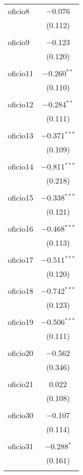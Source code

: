 \begin{table}[!htbp]
\begin{tabular}{@{\extracolsep{5pt}}lc}
 oficio8 & $-$0.076 \\ 
  & (0.112) \\ 
  & \\ 
 oficio9 & $-$0.123 \\ 
  & (0.120) \\ 
  & \\ 
 oficio11 & $-$0.260$^{**}$ \\ 
  & (0.110) \\ 
  & \\ 
 oficio12 & $-$0.284$^{**}$ \\ 
  & (0.111) \\ 
  & \\ 
 oficio13 & $-$0.371$^{***}$ \\ 
  & (0.109) \\ 
  & \\ 
 oficio14 & $-$0.811$^{***}$ \\ 
  & (0.218) \\ 
  & \\ 
 oficio15 & $-$0.338$^{***}$ \\ 
  & (0.121) \\ 
  & \\ 
 oficio16 & $-$0.468$^{***}$ \\ 
  & (0.113) \\ 
  & \\ 
 oficio17 & $-$0.511$^{***}$ \\ 
  & (0.120) \\ 
  & \\ 
 oficio18 & $-$0.742$^{***}$ \\ 
  & (0.123) \\ 
  & \\ 
 oficio19 & $-$0.506$^{***}$ \\ 
  & (0.111) \\ 
  & \\ 
 oficio20 & $-$0.562 \\ 
  & (0.346) \\ 
  & \\ 
 oficio21 & 0.022 \\ 
  & (0.108) \\ 
  & \\ 
 oficio30 & $-$0.107 \\ 
  & (0.114) \\ 
  & \\ 
 oficio31 & $-$0.288$^{*}$ \\ 
  & (0.161) \\ 
  & \\ 

\end{tabular}
\end{table}
